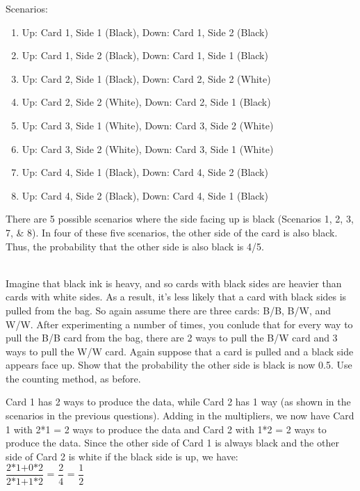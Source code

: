 \documentclass[12pt]{article}\usepackage[]{graphicx}\usepackage[]{color}
\newenvironment{problem}[2][Problem]{\begin{trivlist}
\item[\hskip \labelsep {\bfseries #1}\hskip \labelsep {\bfseries #2.}]}{\end{trivlist}}
\newcommand{\textfrac}[2]{\dfrac{\text{#1}}{\text{#2}}}
\begin{document}
Scenarios:
\begin{enumerate}
  \item Up: Card 1, Side 1 (Black), Down: Card 1, Side 2 (Black)
  \item Up: Card 1, Side 2 (Black), Down: Card 1, Side 1 (Black)
  \item Up: Card 2, Side 1 (Black), Down: Card 2, Side 2 (White)
  \item Up: Card 2, Side 2 (White), Down: Card 2, Side 1 (Black)
  \item Up: Card 3, Side 1 (White), Down: Card 3, Side 2 (White)
  \item Up: Card 3, Side 2 (White), Down: Card 3, Side 1 (White)
  \item Up: Card 4, Side 1 (Black), Down: Card 4, Side 2 (Black)
  \item Up: Card 4, Side 2 (Black), Down: Card 4, Side 1 (Black)
\end{enumerate}

There are 5 possible scenarios where the side facing up is black (Scenarios 1, 2, 3, 7, \& 8). In four of these five scenarios, the other side of the card is also black. Thus, the probability that the other side is also black is 4/5.

\begin{problem}{2M6}
\text{}\\
Imagine that black ink is heavy, and so cards with black sides are heavier than cards with white sides. As a result, it's less likely that a card with black sides is pulled from the bag. So again assume there are three cards: B/B, B/W, and W/W. After experimenting a number of times, you conlude that for every way to pull the B/B card from the bag, there are 2 ways to pull the B/W card and 3 ways to pull the W/W card. Again suppose that a card is pulled and a black side appears face up. Show that the probability the other side is black is now 0.5. Use the counting method, as before.
\end{problem}

Card 1 has 2 ways to produce the data, while Card 2 has 1 way (as shown in the scenarios in the previous questions). Adding in the multipliers, we now have Card 1 with 2*1 = 2 ways to produce the data and Card 2 with 1*2 = 2 ways to produce the data. Since the other side of Card 1 is always black and the other side of Card 2 is white if the black side is up, we have: \\

$\textfrac{2*1+0*2}{2*1+1*2}$ = $\textfrac{2}{4}$ = $\textfrac{1}{2}$
\end{document}
